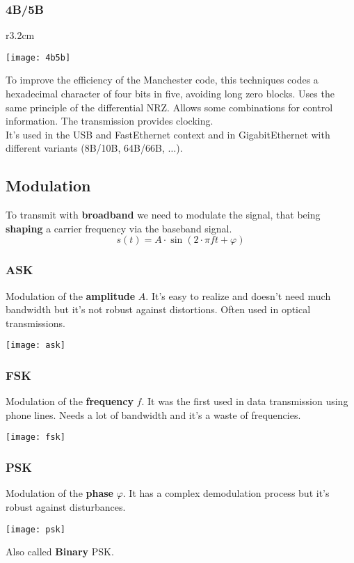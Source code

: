 \subsubsection{4B/5B}
\begin{wrapfigure}[7]{r}{3.2cm}
	\vspace{-1.5cm}
	\begin{center}
		\texttt{[image: 4b5b]}
	\end{center}
\end{wrapfigure}
To improve the efficiency of the Manchester code, this techniques codes a hexadecimal character of four bits in five, avoiding long zero blocks. Uses the same principle of the differential NRZ. Allows some combinations for control information. The transmission provides clocking.\\
It's used in the USB and FastEthernet context and in GigabitEthernet with different variants (8B/10B, 64B/66B, $\ldots$).

\subsection{Modulation}
To transmit with \textbf{broadband} we need to modulate the signal, that being \textbf{shaping} a carrier frequency via the baseband signal.
\begin{equation}
	s(t) = A \cdot \sin(2 \cdot \pi f t + \varphi)
\end{equation}
\subsubsection{ASK}
Modulation of the \textbf{amplitude} $A$. It's easy to realize and doesn't need much bandwidth but it's not robust against distortions. Often used in optical transmissions.
\begin{center}
	\texttt{[image: ask]}
\end{center}

\subsubsection{FSK}
Modulation of the \textbf{frequency} $f$. It was the first used in data transmission using phone lines. Needs a lot of bandwidth and it's a waste of frequencies.
\begin{center}
	\texttt{[image: fsk]}
\end{center}

\subsubsection{PSK}
Modulation of the \textbf{phase} $\varphi$. It has a complex demodulation process but it's robust against disturbances.
\begin{center}
	\texttt{[image: psk]}
\end{center}
Also called \textbf{Binary} PSK.

